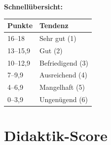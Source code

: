 \documentclass[11pt,a4paper]{article}
\begin{document}
\vspace{2em}

\textbf{Schnellübersicht:}

\begin{tabular}{|l|l|}
\hline
\textbf{Punkte} & \textbf{Tendenz} \\
\hline
16--18 & Sehr gut (1) \\
\hline
13--15,9 & Gut (2) \\
\hline
10--12,9 & Befriedigend (3) \\
\hline
7--9,9 & Ausreichend (4) \\
\hline
4--6,9 & Mangelhaft (5) \\
\hline
0--3,9 & Ungenügend (6) \\
\hline
\end{tabular}

\newpage
\section{Didaktik-Score}
\end{document}
